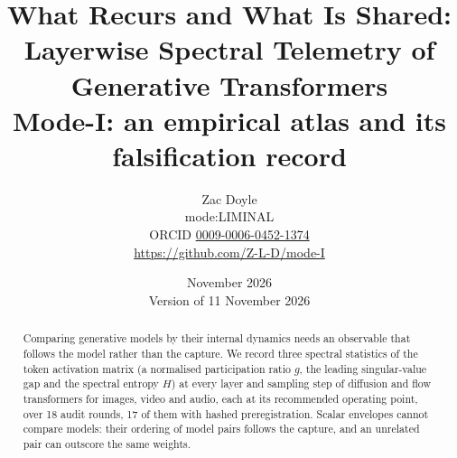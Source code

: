 \documentclass[11pt]{article}
\title{What Recurs and What Is Shared:\\
Layerwise Spectral Telemetry of Generative Transformers\\[4pt]
\large Mode-I: an empirical atlas and its falsification record\\[2pt]}
\author{Zac Doyle\\ \small mode:LIMINAL\\ \small ORCID \href{https://orcid.org/0009-0006-0452-1374}{0009-0006-0452-1374}\\ \small \url{https://github.com/Z-L-D/mode-I}}
\date{November 2026\\ \small Version of 11 November 2026}
\begin{document}
\maketitle

\begin{abstract}
Comparing generative models by their internal dynamics needs an observable that follows the model rather than the capture. We record three spectral statistics of the token activation matrix (a normalised participation ratio $g$, the leading singular-value gap and the spectral entropy $H$) at every layer and sampling step of diffusion and flow transformers for images, video and audio, each at its recommended operating point, over 18 audit rounds, 17 of them with hashed preregistration. Scalar envelopes cannot compare models: their ordering of model pairs follows the capture, and an unrelated pair can outscore the same weights.


\end{abstract}
\end{document}
